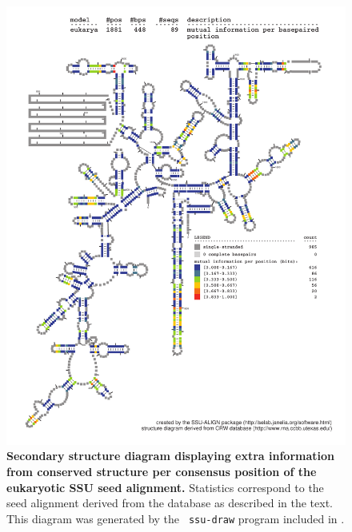\begin{figure}
\begin{center}
\includegraphics[width=5.7in]{Figures/eukarya-0p1-mutinfo}
\end{center}
\caption[Secondary structure diagram displaying extra information 
  from conserved structure per consensus position of the eukaryotic SSU seed
  alignment]{\textbf{Secondary structure diagram displaying extra
  information from conserved structure per consensus position of the eukaryotic SSU seed
  alignment.} Statistics correspond to the  seed
  alignment derived from the  database \cite{CannoneGutell02}
  as described in the text. This diagram was generated by the {\tt
  ssu-draw} program included in .}
\label{fig:euksinfo}
\end{figure}


